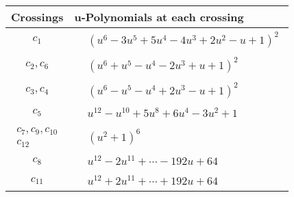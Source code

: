 \documentclass[1p]{elsarticle_modified}
\theoremstyle{definition}
\begin{document}
\begin{tabular}{m{50pt}|m{274pt}}
Crossings & \hspace{64pt}u-Polynomials at each crossing \\
\hline $$\begin{aligned}c_{1}\end{aligned}$$&$\begin{aligned}
&(u^6-3 u^5+5 u^4-4 u^3+2 u^2- u+1)^2
\end{aligned}$\\
\hline $$\begin{aligned}c_{2},c_{6}\end{aligned}$$&$\begin{aligned}
&(u^6+u^5- u^4-2 u^3+u+1)^2
\end{aligned}$\\
\hline $$\begin{aligned}c_{3},c_{4}\end{aligned}$$&$\begin{aligned}
&(u^6- u^5- u^4+2 u^3- u+1)^2
\end{aligned}$\\
\hline $$\begin{aligned}c_{5}\end{aligned}$$&$\begin{aligned}
&u^{12}- u^{10}+5 u^8+6 u^4-3 u^2+1
\end{aligned}$\\
\hline $$\begin{aligned}c_{7},c_{9},c_{10}\\c_{12}\end{aligned}$$&$\begin{aligned}
&(u^2+1)^6
\end{aligned}$\\
\hline $$\begin{aligned}c_{8}\end{aligned}$$&$\begin{aligned}
&u^{12}-2 u^{11}+\cdots-192 u+64
\end{aligned}$\\
\hline $$\begin{aligned}c_{11}\end{aligned}$$&$\begin{aligned}
&u^{12}+2 u^{11}+\cdots+192 u+64
\end{aligned}$\\
\hline
\end{tabular}\\~\\
\newpage\renewcommand{\arraystretch}{1}
\end{document}
